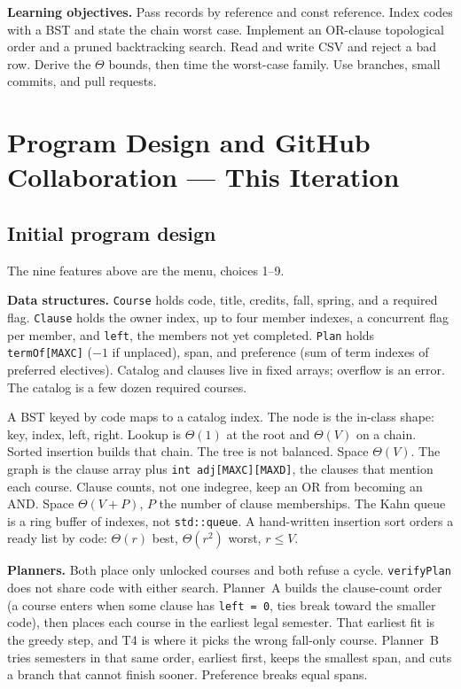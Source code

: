 \documentclass[10pt]{article}
\begin{document}
\textbf{Learning objectives.} Pass records by reference and const reference.
Index codes with a BST and state the chain worst case. Implement an OR-clause
topological order and a pruned backtracking search. Read and write CSV and
reject a bad row. Derive the \(\Theta\) bounds, then time the worst-case
family. Use branches, small commits, and pull requests.

\section{Program Design and GitHub Collaboration --- This Iteration}

\subsection{Initial program design}

The nine features above are the menu, choices 1--9.

\textbf{Data structures.} \texttt{Course} holds code, title, credits, fall,
spring, and a required flag. \texttt{Clause} holds the owner index, up to four
member indexes, a concurrent flag per member, and \texttt{left}, the members
not yet completed. \texttt{Plan} holds \texttt{termOf[MAXC]} (\(-1\) if
unplaced), span, and preference (sum of term indexes of preferred electives).
Catalog and clauses live in fixed arrays; overflow is an error. The catalog is
a few dozen required courses.

A BST keyed by code maps to a catalog index. The node is the in-class shape:
key, index, left, right. Lookup is \(\Theta(1)\) at the root and \(\Theta(V)\)
on a chain. Sorted insertion builds that chain. The tree is not balanced.
Space \(\Theta(V)\). The graph is the clause array plus
\texttt{int adj[MAXC][MAXD]}, the clauses that mention each course. Clause
counts, not one indegree, keep an OR from becoming an AND. Space
\(\Theta(V+P)\), \(P\) the number of clause memberships. The Kahn queue is a
ring buffer of indexes, not \texttt{std::queue}. A hand-written insertion sort
orders a ready list by code: \(\Theta(r)\) best, \(\Theta(r^{2})\) worst,
\(r \le V\).

\textbf{Planners.} Both place only unlocked courses and both refuse a cycle.
\texttt{verifyPlan} does not share code with either search. Planner~A builds
the clause-count order (a course enters when some clause has \texttt{left = 0},
ties break toward the smaller code), then places each course in the earliest
legal semester. That earliest fit is the greedy step, and T4 is where it picks
the wrong fall-only course. Planner~B tries semesters in that same order,
earliest first, keeps the smallest span, and cuts a branch that cannot finish
sooner. Preference breaks equal spans.
\end{document}
